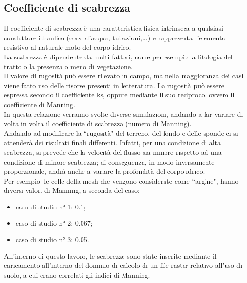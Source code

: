 \subsection{Coefficiente di scabrezza}
Il coefficiente di scabrezza è una caratteristica fisica intrinseca a qualsiasi conduttore idraulico (corsi d'acqua, tubazioni,...) e rappresenta l'elemento resistivo al naturale moto del corpo idrico.\\
La scabrezza è dipendente da molti fattori, come per esempio la litologia del tratto o la presenza o meno di vegetazione.\\
Il valore di rugosità può essere rilevato in campo, ma nella maggioranza dei casi viene fatto uso delle risorse presenti in letteratura. La rugosità può essere espressa secondo il coefficiente ks, oppure mediante il suo reciproco, ovvero il coefficiente di Manning.\\
In questa relazione verranno svolte diverse simulazioni, andando a far variare di volta in volta il coefficiente di scabrezza (numero di Manning).\\
Andando ad modificare la ``rugosità" del terreno, del fondo e delle sponde ci si attenderà dei risultati finali differenti. Infatti, per una condizione di alta scabrezza, si prevede che la velocità del flusso sia minore rispetto ad una condizione di minore scabrezza; di conseguenza, in modo inversamente proporzionale, andrà anche a variare la profondità del corpo idrico.\\
Per esempio, le celle della mesh che vengono considerate come ``argine", hanno diversi valori di Manning, a seconda del caso:
\begin{itemize}
    \item caso di studio n° 1: 0.1;
    \item caso di studio n° 2: 0.067;
    \item caso di studio n° 3: 0.05.
\end{itemize}
All'interno di questo lavoro, le scabrezze sono state inserite mediante il caricamento all'interno del dominio di calcolo di un file raster relativo all'uso di suolo, a cui erano correlati gli indici di Manning.

